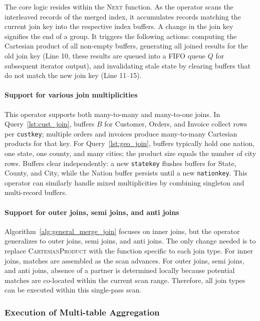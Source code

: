 \documentclass[sigconf, pdfa, nonacm]{acmart}
\begin{document}
The core logic resides within the \textsc{Next} function. As the operator scans the interleaved records of the merged index, it accumulates records matching the current join key into the respective index buffers. 
A change in the join key signifies the end of a group. It triggers the following actions: computing the Cartesian product of all non-empty buffers, generating all joined results for the old join key (Line 10, these results are queued into a FIFO queue \(Q\) for subsequent iterator output), and invalidating stale state by clearing buffers that do not match the new join key (Line 11--15).

\paragraph{Support for various join multiplicities}

This operator supports both many-to-many and many-to-one joins. In Query~\ref{lst:cust_join}, buffers \(B\) for Customer, Orders, and Invoice collect rows per \texttt{custkey}; multiple orders and invoices produce many-to-many Cartesian products for that key. 
For Query~\ref{lst:geo_join}, buffers typically hold one nation, one state, one county, and many cities; the product size equals the number of city rows. Buffers clear independently: a new \texttt{statekey} flushes buffers for State, County, and City, while the Nation buffer persists until a new \texttt{nationkey}. This operator can similarly handle mixed multiplicities by combining singleton and multi-record buffers.

\paragraph{Support for outer joins, semi joins, and anti joins}
Algorithm~\ref{alg:general_merge_join} focuses on inner joins, but the operator generalizes to outer joins, semi joins, and anti joins. The only change needed is to replace \textsc{CartesianProduct} with the function specific to each join type.
For inner joins, matches are assembled as the scan advances. For outer joins, semi joins, and anti joins, absence of a partner is determined locally because potential matches are co-located within the current scan range. Therefore, all join types can be executed within this single-pass scan.

\subsubsection{Execution of Multi-table Aggregation}\label{sssec:multi_table_aggregation_operator}
\end{document}
